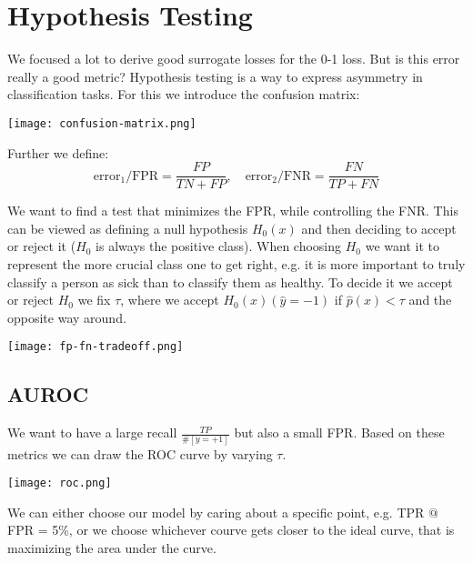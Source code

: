 \section{Hypothesis Testing}

We focused a lot to derive good surrogate losses for the 0-1 loss. But is this error really a good metric? Hypothesis testing is a way to express asymmetry in classification tasks. For this we introduce the confusion matrix:

\begin{center}
	\texttt{[image: confusion-matrix.png]}
\end{center}

Further we define:
$$\text{error}_1 / \text{FPR} = \frac{FP}{TN + FP}, \quad \text{error}_2 / \text{FNR} = \frac{FN}{TP + FN}$$

We want to find a test that minimizes the FPR, while controlling the FNR. This can be viewed as defining a null hypothesis $H_0(x)$ and then deciding to accept or reject it ($H_0$ is always the positive class). When choosing $H_0$ we want it to represent the more crucial class one to get right, e.g. it is more important to truly classify a person as sick than to classify them as healthy. To decide it we accept or reject $H_0$ we fix $\tau$, where we accept $H_0(x) (\hat{y} = -1)$ if $\hat{p}(x) < \tau$ and the opposite way around.

\texttt{[image: fp-fn-tradeoff.png]}

\subsection{AUROC}

We want to have a large recall $\frac{TP}{\#[y = +1]}$ but also a small FPR. Based on these metrics we can draw the ROC curve by varying $\tau$.

\begin{center}
	\texttt{[image: roc.png]}
\end{center}

We can either choose our model by caring about a specific point, e.g. TPR $@$ FPR = 5\%, or we choose whichever courve gets closer to the ideal curve, that is maximizing the area under the curve.